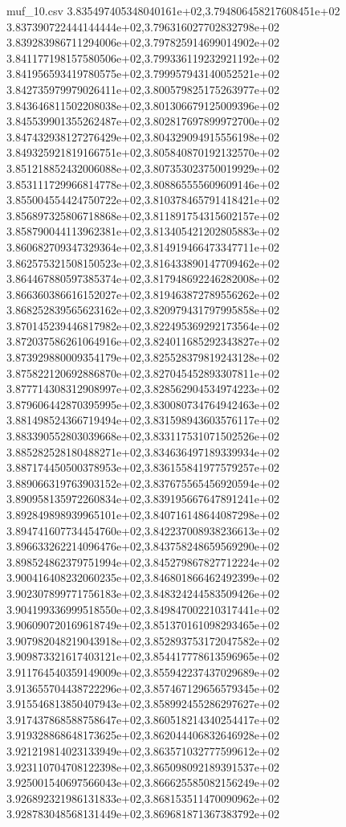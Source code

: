\begin{filecontents*}{muf_10.csv}
3.835497405348040161e+02,3.794806458217608451e+02
3.837390722444144444e+02,3.796316027702832798e+02
3.839283986711294006e+02,3.797825914699014902e+02
3.841177198157580506e+02,3.799336119232921192e+02
3.841956593419780575e+02,3.799957943140052521e+02
3.842735979979026411e+02,3.800579825175263977e+02
3.843646811502208038e+02,3.801306679125009396e+02
3.845539901355262487e+02,3.802817697899972700e+02
3.847432938127276429e+02,3.804329094915556198e+02
3.849325921819166751e+02,3.805840870192132570e+02
3.851218852432006088e+02,3.807353023750019929e+02
3.853111729966814778e+02,3.808865555609609146e+02
3.855004554424750722e+02,3.810378465791418421e+02
3.856897325806718868e+02,3.811891754315602157e+02
3.858790044113962381e+02,3.813405421202805883e+02
3.860682709347329364e+02,3.814919466473347711e+02
3.862575321508150523e+02,3.816433890147709462e+02
3.864467880597385374e+02,3.817948692246282008e+02
3.866360386616152027e+02,3.819463872789556262e+02
3.868252839565623162e+02,3.820979431797995858e+02
3.870145239446817982e+02,3.822495369292173564e+02
3.872037586261064916e+02,3.824011685292343827e+02
3.873929880009354179e+02,3.825528379819243128e+02
3.875822120692886870e+02,3.827045452893307811e+02
3.877714308312908997e+02,3.828562904534974223e+02
3.879606442870395995e+02,3.830080734764942463e+02
3.881498524366719494e+02,3.831598943603576117e+02
3.883390552803039668e+02,3.833117531071502526e+02
3.885282528180488271e+02,3.834636497189339934e+02
3.887174450500378953e+02,3.836155841977579257e+02
3.889066319763903152e+02,3.837675565456920594e+02
3.890958135972260834e+02,3.839195667647891241e+02
3.892849898939965101e+02,3.840716148644087298e+02
3.894741607734454760e+02,3.842237008938236613e+02
3.896633262214096476e+02,3.843758248659569290e+02
3.898524862379751994e+02,3.845279867827712224e+02
3.900416408232060235e+02,3.846801866462492399e+02
3.902307899771756183e+02,3.848324244583509426e+02
3.904199336999518550e+02,3.849847002210317441e+02
3.906090720169618749e+02,3.851370161098293465e+02
3.907982048219043918e+02,3.852893753172047582e+02
3.909873321617403121e+02,3.854417778613596965e+02
3.911764540359149009e+02,3.855942237437029689e+02
3.913655704438722296e+02,3.857467129656579345e+02
3.915546813850407943e+02,3.858992455286297627e+02
3.917437868588758647e+02,3.860518214340254417e+02
3.919328868648173625e+02,3.862044406832646928e+02
3.921219814023133949e+02,3.863571032777599612e+02
3.923110704708122398e+02,3.865098092189391537e+02
3.925001540697566043e+02,3.866625585082156249e+02
3.926892321986131833e+02,3.868153511470090962e+02
3.928783048568131449e+02,3.869681871367383792e+02

\end{filecontents*}
